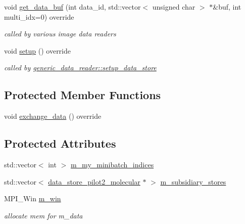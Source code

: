 \begin{DoxyCompactItemize}
void \hyperlink{classlbann_1_1data__store__merge__samples_a8b81d947c1f05c38b7f979ce7e3cef97}{get\+\_\+data\+\_\+buf} (int data\+\_\+id, std\+::vector$<$ unsigned char $>$ $\ast$\&buf, int multi\+\_\+idx=0) override
\begin{DoxyCompactList}\small\item\em called by various image data readers \end{DoxyCompactList}\item 
void \hyperlink{classlbann_1_1data__store__merge__samples_a9f7f027eab6bfb65dd8001939769f476}{setup} () override
\begin{DoxyCompactList}\small\item\em called by \hyperlink{classlbann_1_1generic__data__reader_a8b2a09d38512fc11f1b9d572c89100a7}{generic\+\_\+data\+\_\+reader\+::setup\+\_\+data\+\_\+store} \end{DoxyCompactList}\end{DoxyCompactItemize}
\subsection*{Protected Member Functions}
\begin{DoxyCompactItemize}
\item 
void \hyperlink{classlbann_1_1data__store__merge__samples_a89dc9b0e04c8279cee5e89be2f2ed2a3}{exchange\+\_\+data} () override
\end{DoxyCompactItemize}
\subsection*{Protected Attributes}
\begin{DoxyCompactItemize}
\item 
std\+::vector$<$ int $>$ \hyperlink{classlbann_1_1data__store__merge__samples_acd867c01d5139d47285f73ed80f3b0f4}{m\+\_\+my\+\_\+minibatch\+\_\+indices}
\item 
std\+::vector$<$ \hyperlink{classlbann_1_1data__store__pilot2__molecular}{data\+\_\+store\+\_\+pilot2\+\_\+molecular} $\ast$ $>$ \hyperlink{classlbann_1_1data__store__merge__samples_a8aa1a9abc41edf0cb1a9efeac5e366aa}{m\+\_\+subsidiary\+\_\+stores}
\item 
M\+P\+I\+\_\+\+Win \hyperlink{classlbann_1_1data__store__merge__samples_a8dafb907c605bb38e89ed3d91823f6f3}{m\+\_\+win}
\begin{DoxyCompactList}\small\item\em allocate mem for m\+\_\+data \end{DoxyCompactList}\end{DoxyCompactItemize}


